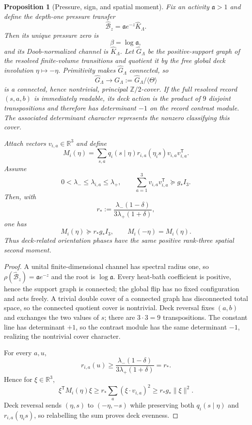 \documentclass[11pt]{article}
\newtheorem{proposition}[theorem]{Proposition}
\theoremstyle{definition}
\theoremstyle{remark}
\newcommand{\R}{\mathbb R}
\newcommand{\norm}[1]{\lVert#1\rVert}
\newcommand{\Ztwo}{\mathbb Z/2}
\begin{document}
\begin{proposition}[Pressure, sign, and spatial moment]
\label{prop:common-origin-pressure-frame}
Fix an activity $\mathfrak a>1$ and define the depth-one pressure transfer
\[
 \widehat{\mathcal B}_z
 =\mathfrak a e^{-z}\widehat K_\Lambda.
\]
Then its unique pressure zero is
\[
 \beta=\log\mathfrak a,
\]
and its Doob-normalized channel is $\widehat K_\Lambda$.  Let
$\widehat G_\Lambda$ be the positive-support graph of the resolved finite-volume
transitions and quotient it by the free global deck involution
$\eta\mapsto-\eta$.  Primitivity makes $\widehat G_\Lambda$ connected, so
\[
 \widehat G_\Lambda\longrightarrow G_\Lambda:=\widehat G_\Lambda/\langle\Theta\rangle
\]
is a connected, hence nontrivial, principal $\Ztwo$-cover.  If the full resolved
record $(s,a,b)$ is immediately readable, its deck action is the product of
$9$ disjoint transpositions and therefore has determinant $-1$ on the record
contrast module.  The associated determinant character represents the nonzero
classifying this cover.

Attach vectors $v_{i,a}\in\R^3$ and define
\[
 M_i(\eta)
 =\sum_{s,a}q_i(s\mid\eta)r_{i,a}(\eta_is)
   v_{i,a}v_{i,a}^{\mathsf T}.
\]
Assume
\[
 0<\lambda_-\le\lambda_{i,a}\le\lambda_+,
 \qquad
 \sum_{a=1}^3v_{i,a}v_{i,a}^{\mathsf T}\succeq g_*I_3.
\]
Then, with
\[
 r_*:=\frac{\lambda_-(1-\delta)}{3\lambda_+(1+\delta)},
\]
one has
\[
 M_i(\eta)\succeq r_*g_*I_3,
 \qquad M_i(-\eta)=M_i(\eta).
\]
Thus deck-related orientation phases have the same positive rank-three spatial
second moment.
\end{proposition}

\begin{proof}
A unital finite-dimensional channel has spectral radius one, so
$\rho(\widehat{\mathcal B}_z)=\mathfrak a e^{-z}$ and the root is
$\log\mathfrak a$.  Every heat-bath coefficient is positive, hence the support
graph is connected; the global flip has no fixed configuration and acts freely.
A trivial double cover of a connected graph has disconnected total space, so the
connected quotient cover is nontrivial.  Deck reversal fixes $(a,b)$ and
exchanges the two values of $s$; there are $3\cdot3=9$ transpositions.  The
constant line has determinant $+1$, so the contrast module has the same
determinant $-1$, realizing the nontrivial cover character.

For every $a,u$,
\[
 r_{i,a}(u)\ge
 \frac{\lambda_-(1-\delta)}{3\lambda_+(1+\delta)}=r_*.
\]
Hence for $\xi\in\R^3$,
\[
 \xi^{\mathsf T}M_i(\eta)\xi
 \ge r_*\sum_a(\xi\cdot v_{i,a})^2
 \ge r_*g_*\norm{\xi}^2.
\]
Deck reversal sends $(\eta,s)$ to $(-\eta,-s)$ while preserving both
$q_i(s\mid\eta)$ and $r_{i,a}(\eta_is)$, so relabelling the sum proves deck
evenness.
\end{proof}
\end{document}
